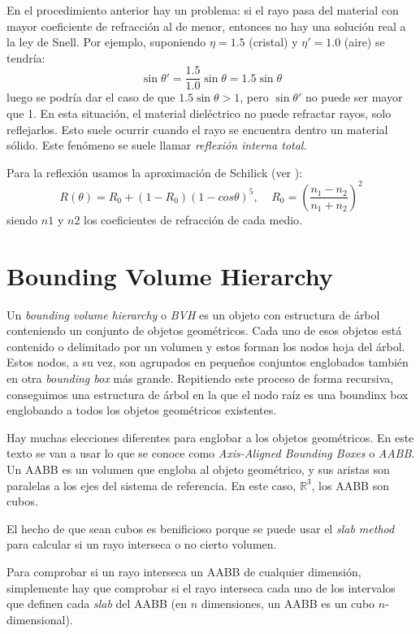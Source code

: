 En el procedimiento anterior hay un problema: si el rayo pasa del material con mayor coeficiente de refracción al de menor, entonces no hay una solución real a la ley de Snell. Por ejemplo, suponiendo $\eta=1.5$ (cristal) y $\eta'=1.0$ (aire) se tendría:
\[
\sin\theta'=\frac{1.5}{1.0}\sin\theta=1.5\sin\theta
\]
luego se podría dar el caso de que $1.5\sin\theta>1$, pero $\sin\theta'$ no puede ser mayor que 1. En esta situación, el material dieléctrico no puede refractar rayos, solo reflejarlos. Esto suele ocurrir cuando el rayo se encuentra dentro un material sólido. Este fenómeno se suele llamar \textit{reflexión interna total}.

Para la reflexión usamos la aproximación de Schilick (ver \cite{schlickapproximation}):
\[
R(\theta)=R_0+(1-R_0)(1-cos\theta)^5, \;\;\;\; R_0=\left(\frac{n_1-n_2}{n_1+n_2}\right)^2
\]
siendo $n1$ y $n2$ los coeficientes de refracción de cada medio.

\section{Bounding Volume Hierarchy}

Un \textit{bounding volume hierarchy} o \textit{BVH} es un objeto con estructura de árbol conteniendo un conjunto de objetos geométricos. Cada uno de esos objetos está contenido o delimitado por un volumen y estos forman los nodos hoja del árbol. Estos nodos, a su vez, son agrupados en pequeños conjuntos englobados también en otra \textit{bounding box} más grande. Repitiendo este proceso de forma recursiva, conseguimos una estructura de árbol en la que el nodo raíz es una boundinx box englobando a todos los objetos geométricos existentes.

Hay muchas elecciones diferentes para englobar a los objetos geométricos. En este texto se van a usar lo que se conoce como \textit{Axis-Aligned Bounding Boxes} o \textit{AABB}. Un AABB es un volumen que engloba al objeto geométrico, y sus aristas son paralelas a los ejes del sistema de referencia. En este caso, $\mathbb{R}^3$, los AABB son cubos.

El hecho de que sean cubos es benificioso porque se puede usar el \textit{slab method} para calcular si un rayo interseca o no cierto volumen.


Para comprobar si un rayo interseca un AABB de cualquier dimensión, simplemente hay que comprobar si el rayo interseca cada uno de los intervalos que definen cada \textit{slab} del AABB (en $n$ dimensiones, un AABB es un cubo $n$-dimensional).

